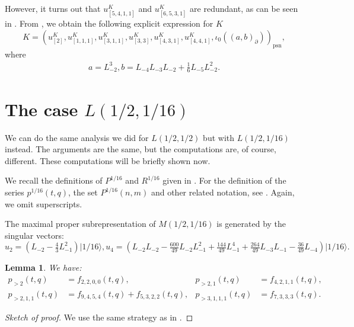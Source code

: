 \documentclass[a4paper, 12pt, reqno]{amsart}
\newtheorem{lemma}[theorem]{Lemma}
\theoremstyle{remark}
\newcommand{\vacsixteen}{{|1/16\rangle}}
\newcommand{\psn}{{\mathrm{psn}}}
\begin{document}
However, it turns out that $u^K_{[5, 4, 1, 1]}$ and $u^K_{[6, 5, 3, 1]}$ are redundant, as can be seen in \cite[m11-m15.ipynb]{sagemath2}.
From \cite[Theorem 2]{andrews_singular_2022}, we obtain the following explicit expression for $K$
\begin{equation*}
  K = (u^K_{[2]}, u^K_{[1, 1, 1]}, u^K_{[3, 1, 1]}, u^K_{[3, 3]}, u^K_{[4, 3, 1]}, u^K_{[4, 4, 1]}, \iota_0((a, b)_{\partial}))_{\psn},
\end{equation*}
where
\begin{align*}
  a = L_{-2}^3, b = L_{-4}L_{-3}L_{-2} + \tfrac{1}{6}L_{-5}L_{-2}^2.
\end{align*}

\section{The case $L(1/2, 1/16)$}
\label{sec:case-l12-116}

We can do the same analysis we did for $L(1/2, 1/2)$ but with $L(1/2, 1/16)$ instead.
The arguments are the same, but the computations are, of course, different.
These computations will be briefly shown now.

We recall the definitions of $P^{1/16}$ and $R^{1/16}$ given in .
For the definition of the series $p^{1/16}(t, q)$, the set $P^{1/16}(n, m)$ and other related notation, see .
Again, we omit superscripts.

The maximal proper subrepresentation of $M(1/2, 1/16)$ is generated by the singular vectors:
\begin{equation*}
  u_2 = (L_{-2} - \tfrac{4}{3}L_{-1}^2)\vacsixteen, u_4 = (L_{-2}L_{-2} - \tfrac{600}{49}L_{-2}L_{-1}^2 + \tfrac{144}{49}L_{-1}^4 + \tfrac{264}{49}L_{-3}L_{-1} - \tfrac{36}{49}L_{-4})\vacsixteen.
\end{equation*}

\begin{lemma}
  \label{lmm:12}
  We have:
  \begin{align*}
    p_{>2}(t, q) &= f_{2, 2, 0, 0}(t, q), &p_{>2, 1}(t, q) &= f_{4, 2, 1, 1}(t, q), \\
    p_{>2, 1, 1}(t, q) &= f_{9, 4, 5, 4}(t, q) + f_{5, 3, 2, 2}(t, q), &p_{>3, 1, 1, 1}(t, q) &= f_{7, 3, 3, 3}(t, q).
  \end{align*}
\end{lemma}

\begin{proof}[Sketch of proof]
  We use the same strategy as in .
\end{proof}
\end{document}
